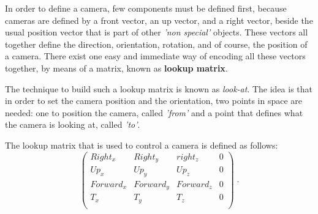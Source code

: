 \documentclass[12pt,a4paper]{extarticle}
\newcommand{\linespace}{\vspace{8pt}}
\begin{document}
In order to define a camera, few components must be defined first, because cameras are defined by a front vector, an up vector, and a right vector, beside the usual position vector that is part of other \textit{'non special'} objects. These vectors all together define the direction, orientation, rotation, and of course, the position of a camera.
There exist one easy and immediate way of encoding all these vectors together, by means of a matrix, known as \textbf{lookup matrix}.
\linespace

The technique to build such a lookup matrix is known as \textit{look-at}. The idea is that in order to set the camera position and the orientation, two points in space are needed: one to position the camera, called \textit{'from'} and a point that defines what the camera is looking at, called \textit{'to'}.

The lookup matrix that is used to control a camera is defined as follows:
\[
\begin{pmatrix}
Right_{x} & Right_{y} & right_{z} & 0\\
Up_{x} & Up_{y} & Up_{z} & 0\\
Forward_{x} & Forward_{y} & Forward_{z} & 0\\
T_{x}& T_{y} & T_{z} & 0\\
\end{pmatrix}
\;.
\]
\end{document}
